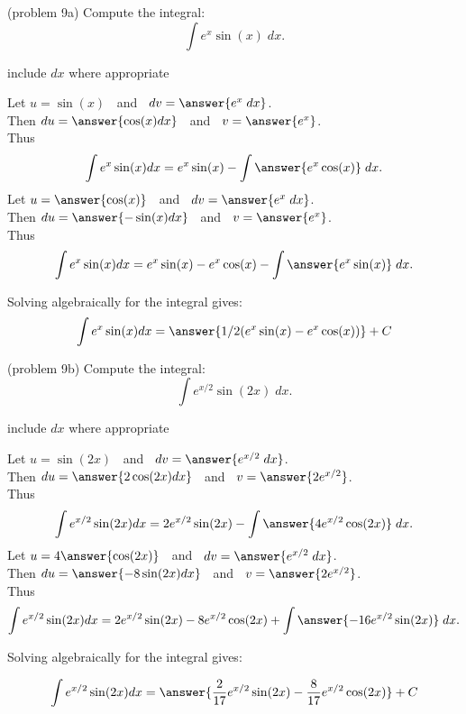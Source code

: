\documentclass[handout]{ximera}
\begin{document}
\begin{problem}(problem 9a)
Compute the integral:
\[
\int e^x\sin(x) \; dx.
\]

\begin{hint}
      include $dx$ where appropriate
  \end{hint}
  Let $u = \sin(x)\;\;$   and   $\;\;dv = \answer{e^x \;dx}$.\\
  Then $du = \answer{\cos(x) dx}\;\;$   and   $\;\;v = \answer{e^x}$.\\
  Thus 
  \[
  \int e^x \sin(x) dx = e^x \sin(x) - \int \answer{e^x \cos(x)} \;dx. 
  \]
  Let $u = \answer{\cos(x)}\;\;$   and   $\;\;dv = \answer{e^x \;dx}$.\\
  Then $du = \answer{-\sin(x) dx}\;\;$   and   $\;\;v = \answer{e^x}$.\\
  Thus 
  \[
  \int e^x \sin(x) dx = e^x \sin(x) - e^x \cos(x) - \int \answer{e^x \sin(x)} \;dx. 
  \]
  
  Solving algebraically for the integral gives:
  \[
  \int e^x \sin(x) dx = \answer{ 1/2(e^x \sin(x) - e^x \cos(x))} + C 
  \]
  
\end{problem}


\begin{problem}(problem 9b)
Compute the integral:
\[
\int e^{x/2}\sin(2x) \; dx.
\]

  \begin{hint}
      include $dx$ where appropriate
  \end{hint}
  Let $u = \sin(2x)\;\;$   and   $\;\;dv = \answer{e^{x/2} \;dx}$.\\
  Then $du = \answer{2\cos(2x) dx}\;\;$   and   $\;\;v = \answer{2e^{x/2}}$.\\
  Thus 
  \[
  \int e^{x/2} \sin(2x) dx = 2e^{x/2} \sin(2x) - \int \answer{4e^{x/2} \cos(2x)} \;dx. 
  \]
  Let $u = 4\answer{\cos(2x)}\;\;$   and   $\;\;dv = \answer{e^{x/2} \;dx}$.\\
  Then $du = \answer{-8\sin(2x) dx}\;\;$   and   $\;\;v = \answer{2e^{x/2}}$.\\
  Thus 
  \[
  \int e^{x/2} \sin(2x) dx = 2e^{x/2} \sin(2x) -8 e^{x/2} \cos(2x) + \int \answer{-16e^{x/2} \sin(2x)} \;dx. 
  \]
  
  Solving algebraically for the integral gives:
  
  \[
  \int e^{x/2} \sin(2x) dx = \answer{ \frac{2}{17}e^{x/2} \sin(2x) - \frac{8}{17}e^{x/2} \cos(2x)} + C 
  \]
  
\end{problem}
\end{document}
